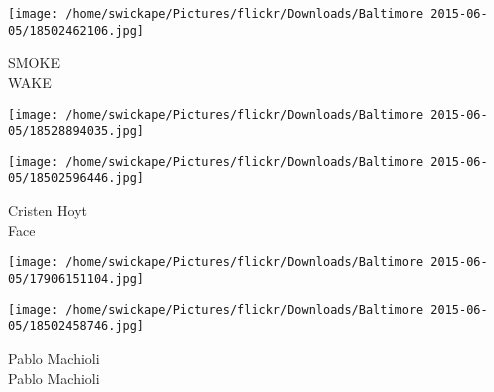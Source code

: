 \documentclass[10pt,letterpaper]{article}
\begin{document}
\vspace{0.25in}
\texttt{[image: /home/swickape/Pictures/flickr/Downloads/Baltimore 2015-06-05/18502462106.jpg]}

SMOKE\\
WAKE
\pagebreak

\texttt{[image: /home/swickape/Pictures/flickr/Downloads/Baltimore 2015-06-05/18528894035.jpg]}

\vspace{0.25in}
\texttt{[image: /home/swickape/Pictures/flickr/Downloads/Baltimore 2015-06-05/18502596446.jpg]}

Cristen Hoyt\\
Face
\pagebreak

\texttt{[image: /home/swickape/Pictures/flickr/Downloads/Baltimore 2015-06-05/17906151104.jpg]}

\vspace{0.25in}
\texttt{[image: /home/swickape/Pictures/flickr/Downloads/Baltimore 2015-06-05/18502458746.jpg]}

Pablo Machioli\\
Pablo Machioli
\pagebreak
\end{document}
